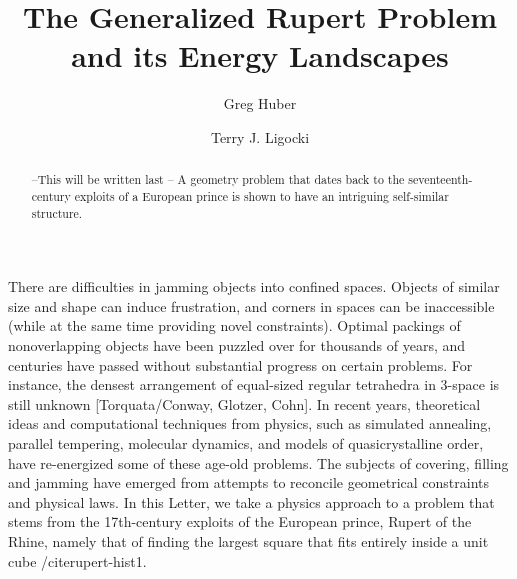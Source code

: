 \documentclass[superscriptaddress,reprint,amsmath,amssymb,aps]{revtex4-1}
\begin{document}

\title{The Generalized Rupert Problem and its Energy Landscapes}


\author{Greg Huber}

\author{Terry J. Ligocki}



\begin{abstract}
--This will be written last --
A geometry problem that dates back to the seventeenth-century exploits
of a European prince is shown to have an intriguing self-similar structure.


\end{abstract}
\maketitle


There are difficulties in jamming objects into confined spaces.  Objects of similar size and shape can induce frustration, and corners in spaces can be inaccessible (while at the same time providing novel constraints).  Optimal packings of nonoverlapping objects have been puzzled over for thousands of years, and centuries have passed without substantial progress on certain problems. For instance, the densest arrangement of equal-sized regular tetrahedra in 3-space is still unknown [Torquata/Conway, Glotzer, Cohn].  In recent years, theoretical ideas and computational techniques from physics, such as simulated annealing, parallel tempering, molecular dynamics\cite{glotz1,glotz2}, and models of quasicrystalline order\cite{??kohn1}, have re-energized some of these age-old problems. The subjects of covering, filling and jamming have emerged from attempts to reconcile geometrical constraints and physical laws. In this Letter, we take a physics approach to a problem that stems from the 17th-century exploits of the European prince, Rupert of the Rhine, namely that of finding the largest square that fits entirely inside a unit cube /cite{rupert-hist1}.
\end{document}

